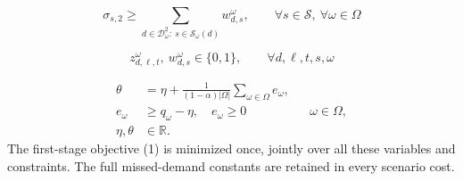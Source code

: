 \documentclass{article}
\begin{document}
\begin{equation}
\sigma_{s,2}
\ge
\sum_{d\in \mathcal{D}^2_\omega:\ s\in \mathcal{S}_\omega(d)} w^\omega_{d,s},
\qquad \forall s \in \mathcal{S},\ \forall \omega \in \Omega
\tag{17}
\end{equation}

\begin{equation}
z^\omega_{d,\ell,t},\ w^\omega_{d,s} \in \{0,1\},
\qquad \forall d,\ell,t,s,\omega
\tag{18}
\end{equation}


\begin{align}
\theta&=\eta+\frac{1}{(1-\alpha)|\Omega|}\sum_{\omega\in\Omega}e_\omega,\tag{19}\\
e_\omega&\ge q_\omega-\eta,\quad e_\omega\ge0 &&\omega\in\Omega,\tag{20}\\
\eta,\theta&\in\mathbb R.\tag{21}
\end{align}
The first-stage objective (1) is minimized once, jointly over all these
variables and constraints.  The full
missed-demand constants are retained in every scenario cost.
\end{document}
